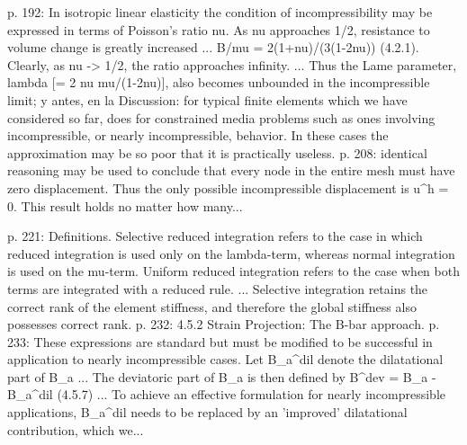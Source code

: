 \documentclass[11pt,a4paper]{article}
\newcommand{\campo}[1]{\textcolor{gris}{\footnotesize #1}}
\begin{document}
\begin{pasaje}\footnotesize p. 192: \textquotedbl{}In isotropic linear elasticity the condition of incompressibility may be expressed in terms of Poisson's ratio nu. As nu approaches 1/2, resistance to volume change is greatly increased ... B/mu = 2(1+nu)/(3(1-2nu)) (4.2.1). Clearly, as nu -\textgreater{} 1/2, the ratio approaches infinity. ... Thus the Lame parameter, lambda [= 2 nu mu/(1-2nu)], also becomes unbounded in the incompressible limit\textquotedbl{}; y antes, en la Discussion: \textquotedbl{}for typical finite elements which we have considered so far, does for constrained media problems such as ones involving incompressible, or nearly incompressible, behavior. In these cases the approximation may be so poor that it is practically useless.\textquotedbl{} p. 208: \textquotedbl{}identical reasoning may be used to conclude that every node in the entire mesh must have zero displacement. Thus the only possible incompressible displacement is u\textasciicircum{}h = 0. This result holds no matter how many...\end{pasaje}
\vspace{3pt}\noindent{\small\textbf{p.\ 221 y 232-234} \quad \campo{Existen tecnicas correctivas: la integracion reducida selectiva (SRI), que subintegra solo los terminos responsables del bloqueo, y la formulacion B-barra, que proyecta la parte volumetrica o de corte de la deformacion. --- tesis/capitulos/02\_marco\_teorico.tex:257 y tesis/capitulos/05\_conclusiones.tex:45}}\par
\begin{pasaje}\footnotesize p. 221: \textquotedbl{}Definitions. Selective reduced integration refers to the case in which reduced integration is used only on the lambda-term, whereas normal integration is used on the mu-term. Uniform reduced integration refers to the case when both terms are integrated with a reduced rule. ... Selective integration retains the correct rank of the element stiffness, and therefore the global stiffness also possesses correct rank.\textquotedbl{} p. 232: \textquotedbl{}4.5.2 Strain Projection: The B-bar approach.\textquotedbl{} p. 233: \textquotedbl{}These expressions are standard but must be modified to be successful in application to nearly incompressible cases. Let B\_a\textasciicircum{}dil denote the dilatational part of B\_a ... The deviatoric part of B\_a is then defined by B\textasciicircum{}dev = B\_a - B\_a\textasciicircum{}dil (4.5.7) ... To achieve an effective formulation for nearly incompressible applications, B\_a\textasciicircum{}dil needs to be replaced by an 'improved' dilatational contribution, which we...\end{pasaje}
\end{document}
